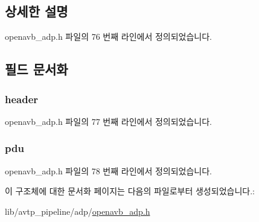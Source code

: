 \subsection{상세한 설명}


openavb\+\_\+adp.\+h 파일의 76 번째 라인에서 정의되었습니다.



\subsection{필드 문서화}
\subsubsection[{\texorpdfstring{header}{header}}]{ header}\hypertarget{structopenavb__adp__entity__info__t_ae9ac3201c2ad757d43a8c75f430a39c3}{}\label{structopenavb__adp__entity__info__t_ae9ac3201c2ad757d43a8c75f430a39c3}


openavb\+\_\+adp.\+h 파일의 77 번째 라인에서 정의되었습니다.

\subsubsection[{\texorpdfstring{pdu}{pdu}}]{ pdu}\hypertarget{structopenavb__adp__entity__info__t_a572a822389c9b7885725f32e0deaa340}{}\label{structopenavb__adp__entity__info__t_a572a822389c9b7885725f32e0deaa340}


openavb\+\_\+adp.\+h 파일의 78 번째 라인에서 정의되었습니다.



이 구조체에 대한 문서화 페이지는 다음의 파일로부터 생성되었습니다.\+:\begin{DoxyCompactItemize}
\item 
lib/avtp\+\_\+pipeline/adp/\hyperlink{openavb__adp_8h}{openavb\+\_\+adp.\+h}\end{DoxyCompactItemize}
